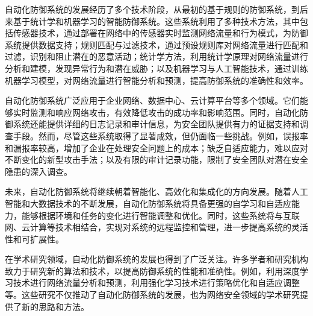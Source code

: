 自动化防御系统的发展经历了多个技术阶段，从最初的基于规则的防御系统，到后来基于统计学和机器学习的智能防御系统。这些系统利用了多种技术方法，其中包括传感器技术，通过部署在网络中的传感器实时监测网络流量和行为模式，为防御系统提供数据支持；规则匹配与过滤技术，通过预设规则库对网络流量进行匹配和过滤，识别和阻止潜在的恶意活动；统计学方法，利用统计学原理对网络流量进行分析和建模，发现异常行为和潜在威胁；以及机器学习与人工智能技术，通过训练机器学习模型，对网络流量进行智能分析和预测，提高防御系统的准确性和效率。

自动化防御系统广泛应用于企业网络、数据中心、云计算平台等多个领域。它们能够实时监测和响应网络攻击，有效降低攻击的成功率和影响范围。同时，自动化防御系统还能提供详细的日志记录和审计信息，为安全团队提供有力的证据支持和调查手段。然而，尽管这些系统取得了显著成效，但仍面临一些挑战。例如，误报率和漏报率较高，增加了企业在处理安全问题上的成本；缺乏自适应能力，难以应对不断变化的新型攻击手法；以及有限的审计记录功能，限制了安全团队对潜在安全隐患的深入调查。

未来，自动化防御系统将继续朝着智能化、高效化和集成化的方向发展。随着人工智能和大数据技术的不断发展，自动化防御系统将具备更强的自学习和自适应能力，能够根据环境和任务的变化进行智能调整和优化。同时，这些系统将与互联网、云计算等技术相结合，实现对系统的远程监控和管理，进一步提高系统的灵活性和可扩展性。

在学术研究领域，自动化防御系统的发展也得到了广泛关注。许多学者和研究机构致力于研究新的算法和技术，以提高防御系统的性能和准确性。例如，利用深度学习技术进行网络流量分析和预测，利用强化学习技术进行策略优化和自适应调整等。这些研究不仅推动了自动化防御系统的发展，也为网络安全领域的学术研究提供了新的思路和方法。